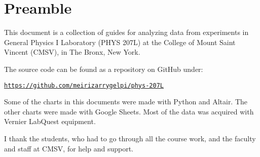 \chapter*{Preamble}
%
This document is a collection of guides for analyzing data from experiments in General Physics I Laboratory (PHYS 207L) at the College of Mount Saint Vincent (CMSV), in The Bronx, New York.

The source code can be found as a repository on GitHub under:
\begin{center}
    \href{https://github.com/meirizarrygelpi/phys-207L}{\texttt{https://github.com/meirizarrygelpi/phys-207L}}
\end{center}
Some of the charts in this documents were made with Python and Altair. The other charts were made with Google Sheets. Most of the data was acquired with Vernier LabQuest equipment.

I thank the students, who had to go through all the course work, and the faculty and staff at CMSV, for help and support.